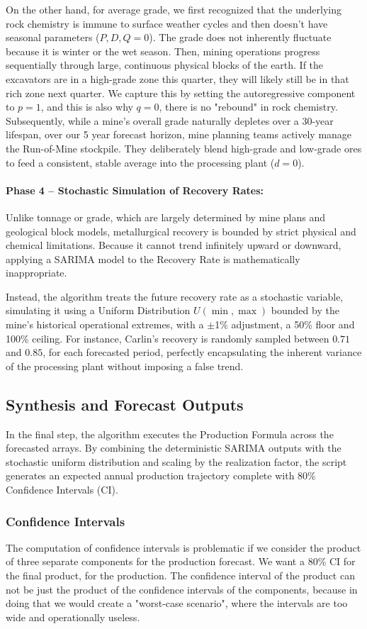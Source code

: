 On the other hand, for average grade, we first recognized that the underlying rock chemistry is immune to surface weather cycles and then doesn't have seasonal parameters ($P,D,Q = 0$). The grade does not inherently fluctuate because it is winter or the wet season. Then, mining operations progress sequentially through large, continuous physical blocks of the earth. If the excavators are in a high-grade zone this quarter, they will likely still be in that rich zone next quarter. We capture this by setting the autoregressive component to $p=1$, and this is also why $q=0$, there is no "rebound" in rock chemistry. Subsequently, while a mine's overall grade naturally depletes over a 30-year lifespan, over our 5 year forecast horizon, mine planning teams actively manage the Run-of-Mine stockpile. They deliberately blend high-grade and low-grade ores to feed a consistent, stable average into the processing plant ($d=0$).


\paragraph{Phase 4 -- Stochastic Simulation of Recovery Rates:}
Unlike tonnage or grade, which are largely determined by mine plans and geological block models, metallurgical recovery is bounded by strict physical and chemical limitations. Because it cannot trend infinitely upward or downward, applying a SARIMA model to the Recovery Rate is mathematically inappropriate. 

Instead, the algorithm treats the future recovery rate as a stochastic variable, simulating it using a Uniform Distribution $U(\min, \max)$ bounded by the mine's historical operational extremes, with a $\pm$1\% adjustment, a 50\% floor and 100\% ceiling. For instance, Carlin's recovery is randomly sampled between $0.71$ and $0.85$, for each forecasted period, perfectly encapsulating the inherent variance of the processing plant without imposing a false trend.
\subsection{Synthesis and Forecast Outputs}
In the final step, the algorithm executes the Production Formula across the forecasted arrays. By combining the deterministic SARIMA outputs with the stochastic uniform distribution and scaling by the realization factor, the script generates an expected annual production trajectory complete with 80\% Confidence Intervals (CI).
\subsubsection{Confidence Intervals}
The computation of confidence intervals is problematic if we consider the product of three separate components for the production forecast. We want a 80\% CI for the final product, for the production.
The confidence interval of the product can not be just the product of the confidence intervals of the components, because in doing that we would create a "worst-case scenario", where the intervals are too wide and operationally useless.

